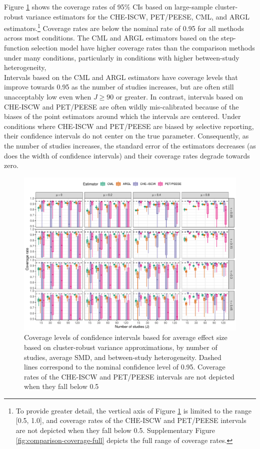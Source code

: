 \documentclass[
  american,
  man, donotrepeattitle,floatsintext]{apa7}
\begin{document}
Figure \ref{fig:comparison-coverage} shows the coverage rates of 95\% CIs based on large-sample cluster-robust variance estimators for the CHE-ISCW, PET/PEESE, CML, and ARGL estimators.\footnote{To provide greater detail, the vertical axis of Figure \ref{fig:comparison-coverage} is limited to the range {[}0.5, 1.0{]}, and coverage rates of the CHE-ISCW and PET/PEESE intervals are not depicted when they fall below 0.5. Supplementary Figure \ref{fig:comparison-coverage-full} depicts the full range of coverage rates.}
Coverage rates are below the nominal rate of 0.95 for all methods across most conditions.
The CML and ARGL estimators based on the step-function selection model have higher coverage rates than the comparison methods under many conditions, particularly in conditions with higher between-study heterogeneity,\\
Intervals based on the CML and ARGL estimators have coverage levels that improve towards 0.95 as the number of studies increases, but are often still unacceptably low even when \(J \geq 90\) or greater.
In contrast, intervals based on CHE-ISCW and PET/PEESE are often wildly mis-calibrated because of the biases of the point estimators around which the intervals are centered.
Under conditions where CHE-ISCW and PET/PEESE are biased by selective reporting, their confidence intervals do not center on the true parameter. Consequently, as the number of studies increases, the standard error of the estimators decreases (as does the width of confidence intervals) and their coverage rates degrade towards zero.

\begin{figure}
\includegraphics{step-function-selection-models-with-dependent-effects_files/figure-latex/comparison-coverage-1} \caption{Coverage levels of confidence intervals based for average effect size based on cluster-robust variance approximations, by number of studies, average SMD, and between-study heterogeneity. Dashed lines correspond to the nominal confidence level of 0.95. Coverage rates of the CHE-ISCW and PET/PEESE intervals are not depicted when they fall below 0.5}\label{fig:comparison-coverage}
\end{figure}
\end{document}

